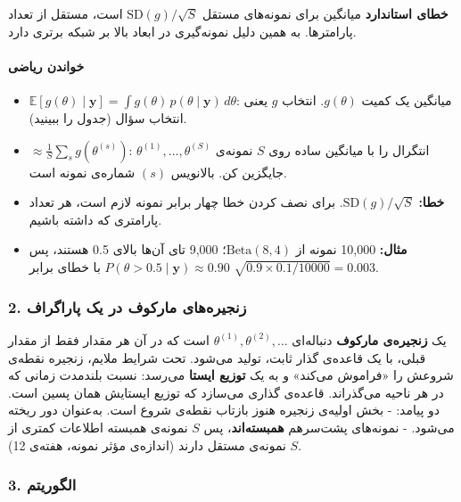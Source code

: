 \textbf{خطای استاندارد } میانگین برای نمونه‌های مستقل
\(\mathrm{SD}(g)/\sqrt{S}\) است، مستقل از تعداد پارامترها. به همین دلیل
نمونه‌گیری در ابعاد بالا بر شبکه برتری دارد.

\paragraph{خواندن ریاضی}

\begin{itemize}
\tightlist
\item
  \(\mathbb{E}[g(\theta)\mid\mathbf{y}] = \int g(\theta)\,p(\theta\mid\mathbf{y})\,d\theta\):
  میانگین  یک کمیت \(g(\theta)\). انتخاب \(g\) یعنی انتخاب
  سؤال (جدول را ببینید).
\item
  \(\approx \frac{1}{S}\sum_{s} g(\theta^{(s)})\): انتگرال را با میانگین
  ساده روی \(S\) نمونه‌ی \(\theta^{(1)}, \dots, \theta^{(S)}\) جایگزین
  کن. بالانویس \((s)\) شماره‌ی نمونه است.
\item
  \textbf{خطا:} \(\mathrm{SD}(g)/\sqrt{S}\). برای نصف کردن خطا چهار
  برابر نمونه لازم است، هر تعداد پارامتری که داشته باشیم.
\item
  \textbf{مثال:} 10,000 نمونه از \(\mathrm{Beta}(8,4)\)؛ 9,000 تای آن‌ها
  بالای 0.5 هستند، پس \(P(\theta > 0.5 \mid \mathbf{y}) \approx 0.90\)
  با خطای  برابر
  \(\sqrt{0.9 \times 0.1/10000} = 0.003\).
\end{itemize}

\subsubsection{2. زنجیره‌های مارکوف در یک پاراگراف}

یک \textbf{زنجیره‌ی مارکوف} دنباله‌ای
\(\theta^{(1)}, \theta^{(2)}, \dots\) است که در آن هر مقدار فقط از مقدار
قبلی، با یک قاعده‌ی گذار ثابت، تولید می‌شود. تحت شرایط ملایم، زنجیره نقطه‌ی
شروعش را «فراموش می‌کند» و به یک \textbf{توزیع ایستا} 
می‌رسد: نسبت بلندمدت زمانی که در هر ناحیه می‌گذراند.  قاعده‌ی
گذاری می‌سازد که توزیع ایستایش همان پسین است. دو پیامد: - بخش اولیه‌ی
زنجیره هنوز بازتاب نقطه‌ی شروع است. به‌عنوان \textbf{}
 دور ریخته می‌شود. - نمونه‌های پشت‌سرهم \textbf{همبسته‌اند}،
پس \(S\) نمونه‌ی همبسته اطلاعات کمتری از \(S\) نمونه‌ی مستقل دارند
(اندازه‌ی مؤثر نمونه، هفته‌ی 12).

\subsubsection{\texorpdfstring{3. الگوریتم
}{3. الگوریتم Metropolis}}


